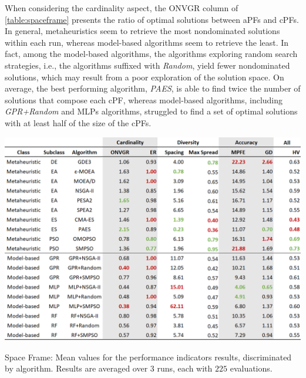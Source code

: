 When considering the cardinality aspect, the \ac{ONVGR} column of \cref{table:spaceframe} presents the ratio of optimal solutions between \acp{aPF} and \acp{cPF}. In general, metaheuristics seem to retrieve the most nondominated solutions within each run, whereas model-based algorithms seem to retrieve the least. In fact, among the model-based algorithms, the algorithms exploring random search strategies, i.e., the algorithms suffixed with \textit{Random}, yield fewer nondominated solutions, which may result from a poor exploration of the solution space. On average, the best performing algorithm, \textit{PAES}, is able to find twice the number of solutions that compose each \ac{cPF}, whereas model-based algorithms, including \textit{GPR+Random} and \acp{MLP} algorithms, struggled to find a set of optimal solutions with at least half of the size of the \acp{cPF}. 
\begin{table}[h!]
	\centering
	\includegraphics[width=\textwidth]{Images/Evaluation/caadria/Results_Mean_20190428.PNG}
	\caption[Space Frame: Mean values for the performance indicators results, discriminated per algorithms]{Space Frame: Mean values for the performance indicators results, discriminated by algorithm. Results are averaged over $3$ runs, each with $225$ evaluations.}
	\label{table:spaceframe}
\end{table}

